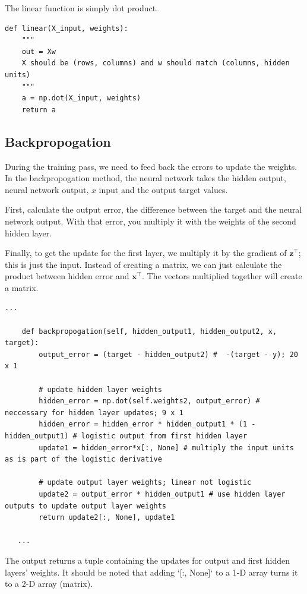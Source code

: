 \documentclass[12pt]{article}%
\begin{document}
The linear function is simply dot product.

\begin{lstlisting}
def linear(X_input, weights):
    """
    out = Xw
    X should be (rows, columns) and w should match (columns, hidden units)
    """
    a = np.dot(X_input, weights)
    return a
\end{lstlisting}




\subsection{Backpropogation}

During the training pass, we need to feed back the errors to update the weights. In the backpropogation method, the neural network takes the hidden output, neural network output, $x$ input and the output target values.

First, calculate the output error, the difference between the target and the neural network output. With that error, you multiply it with the weights of the second hidden layer. 

Finally, to get the update for the first layer, we multiply it by the gradient of $\mathbf{z}^\intercal$; this is just the input. Instead of creating a matrix, we can just calculate the product between hidden error and $\mathbf{x}^\intercal$. The vectors multiplied together will create a matrix. 

\begin{lstlisting}
...
	
    def backpropogation(self, hidden_output1, hidden_output2, x, target):
        output_error = (target - hidden_output2) #  -(target - y); 20 x 1

        # update hidden layer weights
        hidden_error = np.dot(self.weights2, output_error) # neccessary for hidden layer updates; 9 x 1
        hidden_error = hidden_error * hidden_output1 * (1 - hidden_output1) # logistic output from first hidden layer
        update1 = hidden_error*x[:, None] # multiply the input units as is part of the logistic derivative
        
        # update output layer weights; linear not logistic
        update2 = output_error * hidden_output1 # use hidden layer outputs to update output layer weights
        return update2[:, None], update1
   
   ...         
\end{lstlisting}


The output returns a tuple containing the updates for output and first hidden layers' weights. It should be noted that adding `[:, None]` to a 1-D array turns it to a 2-D array (matrix).
\end{document}
